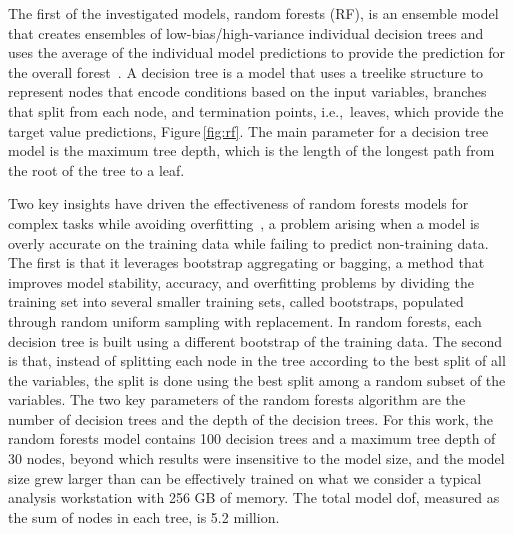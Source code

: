 \documentclass[review]{elsarticle}
\begin{document}
The first of the investigated models, random forests (RF), is an
ensemble model that creates ensembles of low-bias/high-variance
individual decision trees and uses the average of the individual model
predictions to provide the prediction for the overall
forest~\cite{Breiman2001}. A decision tree is a model that uses a
treelike structure to represent nodes that encode conditions based
on the input variables, branches that split from each node, and
termination points, i.e.,\ leaves, which provide the target value
predictions, Figure\,\ref{fig:rf}. The main parameter for a decision
tree model is the maximum tree depth, which is the length of the
longest path from the root of the tree to a leaf.

Two key insights have driven the effectiveness of random forests
models for complex tasks while avoiding
overfitting~\cite{Fernandez-Delgado2014,Liaw2002}, a problem arising
when a model is overly accurate on the training data while failing to
predict non-training data. The first is that it leverages bootstrap
aggregating or bagging, a method that improves model stability,
accuracy, and overfitting problems by dividing the training set into
several smaller training sets, called bootstraps, populated through
random uniform sampling with replacement. In random forests, each
decision tree is built using a different bootstrap of the training
data. The second is that, instead of splitting each node in the
tree according to the best split of all the variables, the split is
done using the best split among a random subset of the variables. The
two key parameters of the random forests algorithm are the number of
decision trees and the depth of the decision trees. For this work, the
random forests model contains 100 decision trees and a maximum tree
depth of 30 nodes, beyond which results were insensitive to the model
size, and the model size grew larger than can be effectively trained on
what we consider a typical analysis workstation with 256 GB of
memory. The total model \gls{dof}, measured as the sum of nodes in
each tree, is 5.2 million.
\end{document}
